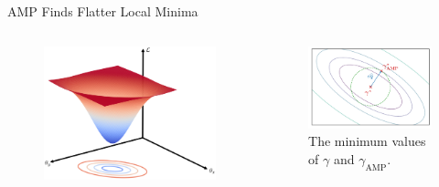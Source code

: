 \begin{frame}{AMP Finds Flatter Local Minima}
\begin{columns}
\begin{figure}
\includegraphics[width=.8\textwidth]{figs/surface.png}
\end{figure}
\begin{figure}
\includegraphics[width=.8\textwidth]{figs/gaussian.pdf}
\caption{The minimum values of $\gamma$ and $\gamma_\mathrm{AMP}$.}
\end{figure}
\end{columns}

\end{frame}

